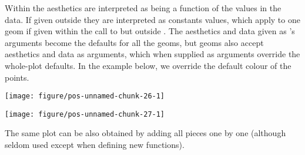 \documentclass[paper=a4,headsepline,BCOR=12mm,twoside,open=right,%
titlepage,headings=small,fontsize=10pt,index=totoc,bibliography=totoc,%
captions=tableheading,captions=nooneline]{scrbook}\usepackage{knitr}
\begin{document}
Within  the aesthetics are interpreted as being a function of the values in the data. If given outside  they are interpreted as constants values, which apply to one geom if given within the call to  but outside . The aesthetics and data given as 's arguments become the defaults for all the geoms, but geoms also accept aesthetics and data as arguments, which when supplied as arguments override the whole-plot defaults. In the example below, we override the default colour of the points.

\begin{knitrout}\footnotesize
{}\color{fgcolor}\begin{kframe}
\begin{alltt}
\hlstd{(} 
       \hlstd{(} \hlstd{=}    \hlopt{/}  \hlopt{+}
  \hlstd{(} \hlstd{=} \hlstd{)}
\end{alltt}
\end{kframe}

{\centering \texttt{[image: figure/pos-unnamed-chunk-26-1]} 

}



\end{knitrout}

\begin{knitrout}\footnotesize
{}\color{fgcolor}\begin{kframe}
\begin{alltt}
\hlstd{(} 
       \hlstd{(} \hlstd{=}    \hlopt{/}   \hlstd{=}  \hlopt{+}
  \hlstd{()}
\end{alltt}
\end{kframe}

{\centering \texttt{[image: figure/pos-unnamed-chunk-27-1]} 

}



\end{knitrout}

The same plot can be also obtained by adding all pieces one by one (although
seldom used except when defining new functions).
\end{document}
